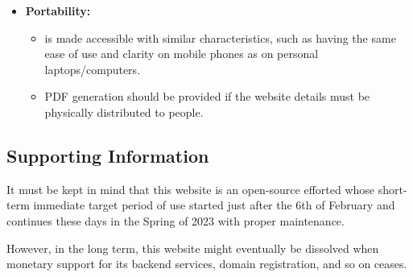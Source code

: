 \begin{itemize}
  \vfill
  \newpage
  
  \item \textbf{Portability:}
    \begin{itemize}[label=$\blacksquare$]
      \item \afetbilgi is made accessible with similar characteristics, such as having the same ease of use and clarity on mobile phones as on personal laptops/computers.
      \item PDF generation should be provided if the website details must be physically distributed to people.
    \end{itemize}
\end{itemize}

\subsection{Supporting Information}

It must be kept in mind that this website is an open-source efforted whose short-term immediate target period of use started just after the 6th of February and continues these days in the Spring of 2023 with proper maintenance. 

However, in the long term, this website might eventually be dissolved when monetary support for its backend services, domain registration, and so on ceases.
